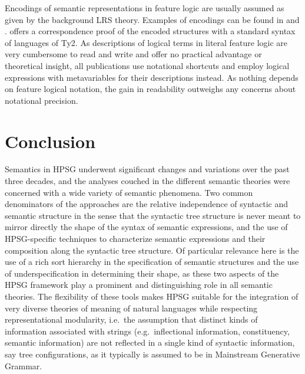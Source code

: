 \documentclass[output=paper,biblatex,babelshorthands,newtxmath,draftmode,colorlinks,citecolor=brown]{langscibook}
\begin{document}
Encodings of semantic representations in feature logic are usually assumed as given by the
background LRS theory. Examples of encodings can be found in \citet{Sailer2000a} and
\citet{Richter2004a-u}. \citet{Sailer2000a} offers a correspondence proof of the encoded structures
with a standard syntax of languages of Ty2. As descriptions of logical terms in literal feature
logic are very cumbersome to read and write and offer no practical advantage or theoretical insight,
all publications use notational shortcuts and employ logical expressions with metavariables for
their descriptions instead. As nothing depends on feature logical notation, the gain in readability
outweighs any concerns about notational precision.%
\indexlrsend

\section{Conclusion}

Semantics in HPSG underwent significant changes and variations over the past three decades, and the analyses couched in the different semantic theories were concerned with a wide variety of semantic phenomena. Two common denominators of the approaches are the relative independence of syntactic and
 semantic structure in the sense that the syntactic tree structure is never meant to mirror directly the shape of the syntax of semantic expressions, and the use of HPSG-specific techniques to characterize semantic expressions and their composition along the syntactic tree structure. Of particular relevance here is the use of a rich sort hierarchy in the specification of semantic structures and the use of underspecification in determining their shape, as these two aspects of the HPSG framework play a prominent and distinguishing role in all semantic theories. The flexibility of these tools makes HPSG suitable for the integration of very diverse theories of meaning of natural languages while respecting representational modularity, i.e.\ the 
assumption that 
 distinct kinds of information associated with strings (e.g.\ inflectional information, constituency, semantic information) are not reflected in a single kind of syntactic information, say tree configurations, as it typically is assumed to be in Mainstream Generative Grammar.
\end{document}
